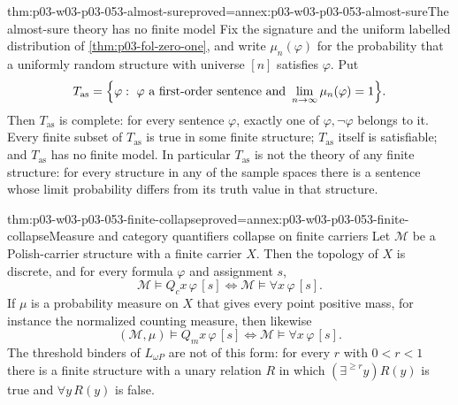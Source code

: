 \begin{hbtheorem}{thm:p03-w03-p03-053-almost-sure}{proved=annex:p03-w03-p03-053-almost-sure}{The almost-sure theory has no finite model}
Fix the signature and the uniform labelled distribution of
\cref{thm:p03-fol-zero-one}, and write \(\mu_n(\varphi)\) for the
probability that a uniformly random structure with universe \([n]\)
satisfies \(\varphi\). Put
\[
 T_{\mathrm{as}}=\Bigl\{\varphi:\ \varphi\ \text{a first-order sentence and}
   \ \lim_{n\to\infty}\mu_n(\varphi)=1\Bigr\}.
\]
Then \(T_{\mathrm{as}}\) is complete: for every sentence \(\varphi\),
exactly one of \(\varphi,\neg\varphi\) belongs to it. Every finite
subset of \(T_{\mathrm{as}}\) is true in some finite structure;
\(T_{\mathrm{as}}\) itself is satisfiable; and \(T_{\mathrm{as}}\) has no
finite model. In particular \(T_{\mathrm{as}}\) is not the theory of
any finite structure: for every structure in any of the sample spaces
there is a sentence whose limit probability differs from its truth
value in that structure.
\end{hbtheorem}

\begin{hbtheorem}{thm:p03-w03-p03-053-finite-collapse}{proved=annex:p03-w03-p03-053-finite-collapse}{Measure and category quantifiers collapse on finite carriers}
Let \(\mathcal M\) be a Polish-carrier structure with a finite carrier
\(X\). Then the topology of \(X\) is discrete, and for every formula
\(\varphi\) and assignment \(s\),
\[
 \mathcal M\models Q_cx\,\varphi\,[s]
   \iff \mathcal M\models\forall x\,\varphi\,[s].
\]
If \(\mu\) is a probability measure on \(X\) that gives every point
positive mass, for instance the normalized counting measure, then
likewise
\[
 (\mathcal M,\mu)\models Q_mx\,\varphi\,[s]
   \iff \mathcal M\models\forall x\,\varphi\,[s].
\]
The threshold binders of \(L_{\omega P}\) are not of this form: for
every \(r\) with \(0<r<1\) there is a finite structure with a unary
relation \(R\) in which \((\exists^{\ge r}y)R(y)\) is true and
\(\forall y\,R(y)\) is false.
\end{hbtheorem}

